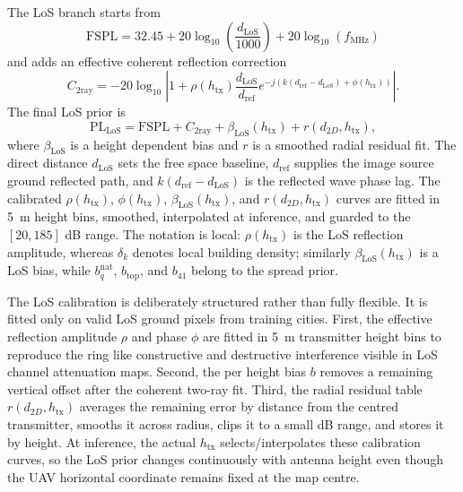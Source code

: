 \documentclass[journal]{IEEEtran}
\begin{document}
The LoS branch starts from
\begin{equation}
\mathrm{FSPL}
=32.45+20\log_{10}\!\left(\frac{d_{\mathrm{LoS}}}{1000}\right)
+20\log_{10}(f_{\mathrm{MHz}})
\label{eq:fspl-paper}
\end{equation}
and adds an effective coherent reflection correction
\begin{equation}
C_{\mathrm{2ray}}
=-20\log_{10}\!\left|
1+\rho(h_{\mathrm{tx}})\frac{d_{\mathrm{LoS}}}{d_{\mathrm{ref}}}
e^{-j(k(d_{\mathrm{ref}}-d_{\mathrm{LoS}})+\phi(h_{\mathrm{tx}}))}
\right|.
\label{eq:tworay-paper}
\end{equation}
The final LoS prior is
\begin{equation}
\mathrm{PL}_{\mathrm{LoS}}
=\mathrm{FSPL}+C_{\mathrm{2ray}}+\beta_{\mathrm{LoS}}(h_{\mathrm{tx}})
+r(d_{2D},h_{\mathrm{tx}}),
\label{eq:los-prior-paper}
\end{equation}
where \(\beta_{\mathrm{LoS}}\) is a height dependent bias and \(r\) is a smoothed radial residual
fit. The direct distance \(d_{\mathrm{LoS}}\) sets the free space baseline,
\(d_{\mathrm{ref}}\) supplies the image source ground reflected path, and
\(k(d_{\mathrm{ref}}-d_{\mathrm{LoS}})\) is the reflected wave phase lag.
The calibrated \(\rho(h_{\mathrm{tx}})\), \(\phi(h_{\mathrm{tx}})\),
\(\beta_{\mathrm{LoS}}(h_{\mathrm{tx}})\), and \(r(d_{2D},h_{\mathrm{tx}})\) curves are fitted in
\SI{5}{m} height bins, smoothed, interpolated at inference, and guarded to the
\([20,185]\) dB range. The notation is local: \(\rho(h_{\mathrm{tx}})\) is the
LoS reflection amplitude, whereas \(\delta_k\) denotes local building density;
similarly \(\beta_{\mathrm{LoS}}(h_{\mathrm{tx}})\) is a LoS bias, while \(b_q^{\mathrm{nat}}\),
\(b_{\mathrm{top}}\), and \(b_{41}\) belong to the spread prior.

The LoS calibration is deliberately structured rather than fully flexible. It
is fitted only on valid LoS ground pixels from training cities. First, the
effective reflection amplitude \(\rho\) and phase \(\phi\) are fitted in
\SI{5}{m} transmitter height bins to reproduce the ring like constructive and
destructive interference visible in LoS channel attenuation maps. Second, the per height
bias \(b\) removes a remaining vertical offset after the coherent two-ray fit.
Third, the radial residual table \(r(d_{2D},h_{\mathrm{tx}})\) averages the
remaining error by distance from the centred transmitter, smooths it across
radius, clips it to a small dB range, and stores it by height. At inference,
the actual \(h_{\mathrm{tx}}\) selects/interpolates these calibration curves,
so the LoS prior changes continuously with antenna height even though the UAV
horizontal coordinate remains fixed at the map centre.
\end{document}
